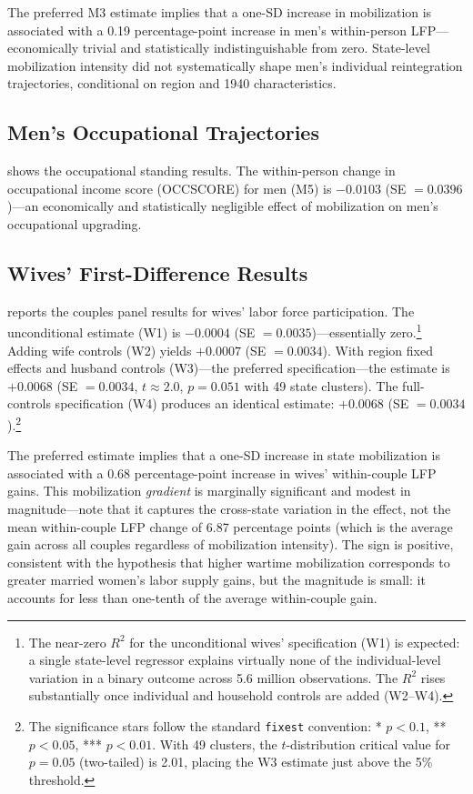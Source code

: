 \documentclass[12pt]{article}
\begin{document}
The preferred M3 estimate implies that a one-SD increase in mobilization is associated with a 0.19 percentage-point increase in men's within-person LFP---economically trivial and statistically indistinguishable from zero. State-level mobilization intensity did not systematically shape men's individual reintegration trajectories, conditional on region and 1940 characteristics.



\subsection{Men's Occupational Trajectories}

 shows the occupational standing results. The within-person change in occupational income score (OCCSCORE) for men (M5) is $-0.0103$ (SE $= 0.0396$)---an economically and statistically negligible effect of mobilization on men's occupational upgrading.



\subsection{Wives' First-Difference Results}

 reports the couples panel results for wives' labor force participation. The unconditional estimate (W1) is $-0.0004$ (SE $= 0.0035$)---essentially zero.\footnote{The near-zero $R^2$ for the unconditional wives' specification (W1) is expected: a single state-level regressor explains virtually none of the individual-level variation in a binary outcome across 5.6 million observations. The $R^2$ rises substantially once individual and household controls are added (W2--W4).} Adding wife controls (W2) yields $+0.0007$ (SE $= 0.0034$). With region fixed effects and husband controls (W3)---the preferred specification---the estimate is $+0.0068$ (SE $= 0.0034$, $t \approx 2.0$, $p = 0.051$ with 49 state clusters). The full-controls specification (W4) produces an identical estimate: $+0.0068$ (SE $= 0.0034$).\footnote{The significance stars follow the standard \texttt{fixest} convention: * $p<0.1$, ** $p<0.05$, *** $p<0.01$. With 49 clusters, the $t$-distribution critical value for $p = 0.05$ (two-tailed) is 2.01, placing the W3 estimate just above the 5\% threshold.}

The preferred estimate implies that a one-SD increase in state mobilization is associated with a 0.68 percentage-point increase in wives' within-couple LFP gains. This mobilization \textit{gradient} is marginally significant and modest in magnitude---note that it captures the cross-state variation in the effect, not the mean within-couple LFP change of 6.87 percentage points (which is the average gain across all couples regardless of mobilization intensity). The sign is positive, consistent with the hypothesis that higher wartime mobilization corresponds to greater married women's labor supply gains, but the magnitude is small: it accounts for less than one-tenth of the average within-couple gain.
\end{document}
